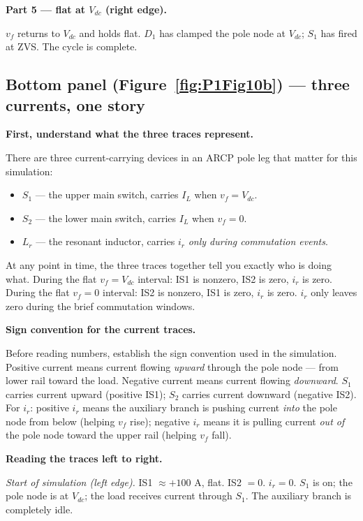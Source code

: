 \documentclass[12pt, a4paper]{article}
\def\,{ }%
\newcommand{\Vdc}{V_{dc}}
\newcommand{\vf}{v_f}
\newcommand{\ir}{i_r}
\newcommand{\IL}{I_L}
\newcommand{\Lr}{L_r}
\newcommand{\figref}[1]{Figure~\ref{#1}}
\begin{document}
\medskip
\textbf{Part 5 --- flat at $\Vdc$ (right edge).}

$\vf$ returns to $\Vdc$ and holds flat.
$D_1$ has clamped the pole node at $\Vdc$; $S_1$ has fired at ZVS.
The cycle is complete.

\subsection*{Bottom panel (\figref{fig:P1Fig10b}) --- three currents, one story}

\textbf{First, understand what the three traces represent.}

There are three current-carrying devices in an ARCP pole leg that matter
for this simulation:
\begin{itemize}
    \item $S_1$ --- the upper main switch, carries $\IL$ when $\vf = \Vdc$.
    \item $S_2$ --- the lower main switch, carries $\IL$ when $\vf = 0$.
    \item $\Lr$ --- the resonant inductor, carries $\ir$ \emph{only during
          commutation events}.
\end{itemize}
At any point in time, the three traces together tell you exactly who is
doing what.
During the flat $\vf = \Vdc$ interval: IS1 is nonzero, IS2 is zero,
$\ir$ is zero.
During the flat $\vf = 0$ interval: IS2 is nonzero, IS1 is zero, $\ir$
is zero.
$\ir$ only leaves zero during the brief commutation windows.

\medskip
\textbf{Sign convention for the current traces.}

Before reading numbers, establish the sign convention used in the
simulation.
Positive current means current flowing \emph{upward} through the pole node
--- from lower rail toward the load.
Negative current means current flowing \emph{downward}.
$S_1$ carries current upward (positive IS1); $S_2$ carries current downward
(negative IS2).
For $\ir$: positive $\ir$ means the auxiliary branch is pushing current
\emph{into} the pole node from below (helping $\vf$ rise); negative $\ir$
means it is pulling current \emph{out of} the pole node toward the upper
rail (helping $\vf$ fall).

\medskip
\textbf{Reading the traces left to right.}

\textit{Start of simulation (left edge).}
IS1 $\approx +100$\,A, flat.
IS2 $= 0$.
$\ir = 0$.
$S_1$ is on; the pole node is at $\Vdc$; the load receives current through
$S_1$.
The auxiliary branch is completely idle.
\end{document}

